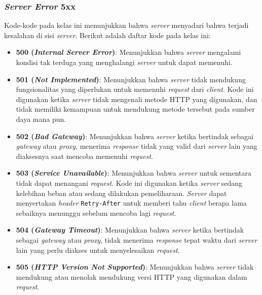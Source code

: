 \subsubsection{\textit{Server Error} 5xx}
\label{subsubsec:020104-server-error-5xx}

Kode-kode pada kelas ini menunjukkan bahwa \textit{server} menyadari bahwa terjadi kesalahan di sisi \textit{server}. Berikut adalah daftar kode pada kelas ini:

\begin{itemize}

    \item \textbf{500 (\textit{Internal Server Error})}: Menunjukkan bahwa \textit{server} mengalami kondisi tak terduga yang menghalangi \textit{server} untuk dapat memenuhi.
  
    \item \textbf{501 (\textit{Not Implemented})}: Menunjukkan bahwa \textit{server} tidak mendukung fungsionalitas yang diperlukan untuk memenuhi \textit{request} dari \textit{client}. Kode ini digunakan ketika \textit{server} tidak mengenali metode HTTP yang digunakan, dan tidak memiliki kemampuan untuk mendukung metode tersebut pada sumber daya mana pun.
  
    \item \textbf{502 (\textit{Bad Gateway})}: Menunjukkan bahwa \textit{server} ketika bertindak sebagai \textit{gateway} atau \textit{proxy}, menerima \textit{response} tidak yang valid dari \textit{server} lain yang diaksesnya saat mencoba memenuhi \textit{request}.
  
    \item \textbf{503 (\textit{Service Unavailable})}: Menunjukkan bahwa \textit{server} untuk sementara tidak dapat menangani \textit{request}. Kode ini digunakan ketika \textit{server} sedang kelebihan beban atau sedang dilakukan pemeliharaan. \textit{Server} dapat menyertakan \textit{header} \texttt{Retry-After} untuk memberi tahu \textit{client} berapa lama sebaiknya menunggu sebelum mencoba lagi \textit{request}.
  
    \item \textbf{504 (\textit{Gateway Timeout})}: Menunjukkan bahwa \textit{server} ketika bertindak sebagai \textit{gateway} atau \textit{proxy}, tidak menerima \textit{response} tepat waktu dari \textit{server} lain yang perlu diakses untuk menyelesaikan \textit{request}.
  
    \item \textbf{505 (\textit{HTTP Version Not Supported})}: Menunjukkan bahwa \textit{server} tidak mendukung atau menolak mendukung versi HTTP yang digunakan dalam \textit{request}.
  

\end{itemize}

